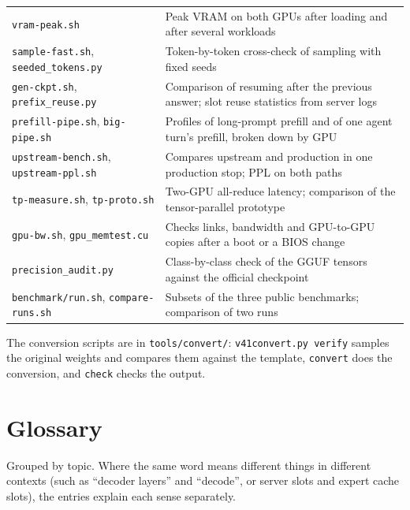 \documentclass[11pt,a4paper]{article}
\newcommand{\code}[1]{\texttt{#1}}
\begin{document}
\begin{table}[tp]
\begin{tabularx}{\textwidth}{@{}l X@{}}
    \code{vram-peak.sh} & Peak VRAM on both GPUs after loading and after several workloads \\
    \code{sample-fast.sh}, \code{seeded\_tokens.py} & Token-by-token cross-check of sampling with fixed seeds \\
    \code{gen-ckpt.sh}, \code{prefix\_reuse.py} & Comparison of resuming after the previous answer; slot reuse statistics from server logs \\
    \code{prefill-pipe.sh}, \code{big-pipe.sh} & Profiles of long-prompt prefill and of one agent turn's prefill, broken down by GPU \\
    \code{upstream-bench.sh}, \code{upstream-ppl.sh} & Compares upstream and production in one production stop; PPL on both paths \\
    \code{tp-measure.sh}, \code{tp-proto.sh} & Two-GPU all-reduce latency; comparison of the tensor-parallel prototype \\
    \code{gpu-bw.sh}, \code{gpu\_memtest.cu} & Checks links, bandwidth and GPU-to-GPU copies after a boot or a BIOS change \\
    \code{precision\_audit.py} & Class-by-class check of the GGUF tensors against the official checkpoint \\
    \code{benchmark/run.sh}, \code{compare-runs.sh} & Subsets of the three public benchmarks; comparison of two runs \\
    \bottomrule
  \end{tabularx}
\end{table}

The conversion scripts are in \code{tools/convert/}: \code{v41convert.py verify} samples the original weights and compares them against the template, \code{convert} does the conversion, and \code{check} checks the output.

\clearpage
\section{Glossary}
\label{sec:glossary}

Grouped by topic. Where the same word means different things in different contexts (such as ``decoder layers'' and ``decode'', or server slots and expert cache slots), the entries explain each sense separately.

\end{document}
